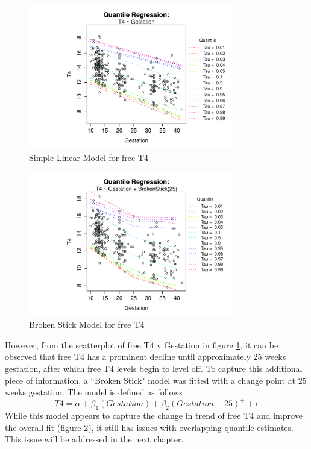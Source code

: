 \documentclass[12pt,a4paper]{report}
\begin{document}
\begin{figure}[ht]\centering
    \includegraphics[width=9cm]{QRT4Model1.pdf}
    \caption{Simple Linear Model for free T4}
    \label{QR:T4Model1}
\end{figure}
\vspace{2mm}
\begin{figure}[ht]\centering
    \includegraphics[width=9cm]{QRT4Model2.pdf}
    \caption{Broken Stick Model for free T4}
    \label{QR:T4Model2}
\end{figure}
\vspace{2mm}

However, from the scatterplot of free T$4$ v Gestation in figure \ref{QR:T4Model1}, it can be observed that free T$4$ has a prominent decline until approximately $25$ weeks gestation, after which free T$4$ levels begin to level off. To capture this additional piece of information, a ``Broken Stick" model was fitted with a change point at $25$ weeks gestation. The model is defined as follows
$$ T4 = \alpha + \beta_{1}(Gestation) + \beta_{2}(Gestation-25)^{+} + \epsilon $$
While this model appears to capture the change in trend of free T$4$ and improve the overall fit (figure \ref{QR:T4Model2}), it still has issues with overlapping quantile estimates. This issue will be addressed in the next chapter.
\end{document}
